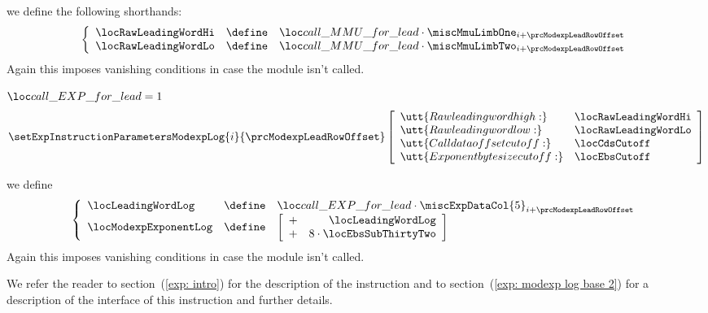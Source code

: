 \begin{description}
\begin{description}
\[{						}
					\]
				\item[\underline{Setting some shorthands:}] 
					we define the following shorthands:
					\[
						\left\{ \begin{array}{lcl}
							\locRawLeadingWordHi & \define & \locCallMmuForModexpLead \cdot \miscMmuLimbOne _{i + \prcModexpLeadRowOffset} \\
							\locRawLeadingWordLo & \define & \locCallMmuForModexpLead \cdot \miscMmuLimbTwo _{i + \prcModexpLeadRowOffset} \\
						\end{array} \right.
					\]
					\saNote{} Again this imposes vanishing conditions in case the \mmuMod{} module isn't called.
				\item[\underline{Setting \expMod{} values:}] 
					\If $\locCallExpForModexpLead = 1$ \Then
					\[
						\setExpInstructionParametersModexpLog {i}{\prcModexpLeadRowOffset}
						\left[ \begin{array}{ll}
							\utt{Raw leading word high:}     & \locRawLeadingWordHi  \\
							\utt{Raw leading word low:}      & \locRawLeadingWordLo  \\
							\utt{Call data offset cutoff:}   & \locCdsCutoff         \\
							\utt{Exponent byte size cutoff:} & \locEbsCutoff         \\
						\end{array} \right]
					\]
				\item[\underline{Setting some shorthands:}] 
					we define
					\[
						\left\{ \begin{array}{lcl}
							\locLeadingWordLog    & \define & \locCallExpForModexpLead \cdot \miscExpDataCol{5}_{i + \prcModexpLeadRowOffset} \\
							\locModexpExponentLog & \define &
							\left[ \begin{array}{cr}
								+ & \locLeadingWordLog \\
								+ & 8 \cdot \locEbsSubThirtyTwo           \\
							\end{array} \right] \\
						\end{array} \right.
					\]
					\saNote{} Again this imposes vanishing conditions in case the \expMod{} module isn't called.
			\end{description}
		\end{description}
		\saNote{} We refer the reader to 
		section~(\ref{exp: intro}) for the description of the \expInstModexpLog{} instruction and to
		section~(\ref{exp: modexp log base 2}) for a description of the interface of this instruction and further details.

